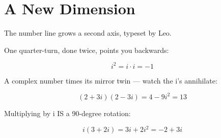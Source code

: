 
\section{A New Dimension}

The number line grows a second axis, typeset by Leo.

One quarter-turn, done twice, points you backwards:

$$ i^2 = i \cdot i = -1 $$

A complex number times its mirror twin — watch the i's annihilate:

$$ (2+3i)(2-3i) = 4 - 9i^2 = 13 $$

Multiplying by i IS a 90-degree rotation:

$$ i\left(3+2i\right) = 3i + 2i^2 = -2 + 3i $$
